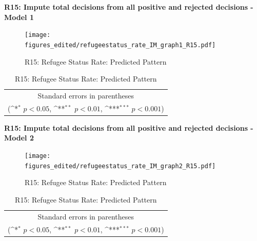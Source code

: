 \documentclass[10pt,a4paper]{scrartcl}
\begin{document}
\clearpage
\textbf{R15: Impute total decisions from all positive and rejected decisions - Model 1}
\begin{figure}[!ht]
	\centering
	\texttt{[image: figures\_edited/refugeestatus\_rate\_IM\_graph1\_R15.pdf]}
	\caption{R15: Refugee Status Rate: Predicted Pattern}
\end{figure}

\begin{table}[!ht]\centering
	\renewcommand{\arraystretch}{1.25}
	\def\sym#1{\ifmmode^{#1}\else\(^{#1}\)\fi}
	\caption{R15: Refugee Status Rate: Predicted Pattern}
	\begin{tabular}{l*{2}{c}}
		\hline\hline
		
		\hline\hline
		\multicolumn{3}{c}{\footnotesize Standard errors in parentheses} \\
		\multicolumn{3}{c}{\footnotesize (\sym{*} \(p<0.05\), \sym{**} \(p<0.01\), \sym{***} \(p<0.001\))}\\
	\end{tabular}
\end{table}

\clearpage
\textbf{R15: Impute total decisions from all positive and rejected decisions - Model 2}
\begin{figure}[!ht]
	\centering
	\texttt{[image: figures\_edited/refugeestatus\_rate\_IM\_graph2\_R15.pdf]}
	\caption{R15: Refugee Status Rate: Predicted Pattern}
\end{figure}

\begin{table}[!ht]\centering
	\footnotesize
	\renewcommand{\arraystretch}{1.2}
	\def\sym#1{\ifmmode^{#1}\else\(^{#1}\)\fi}
	\caption{R15: Refugee Status Rate: Predicted Pattern}
	\begin{tabular}{l*{2}{c}}
		\hline\hline
		
		\hline\hline
		\multicolumn{3}{c}{\footnotesize Standard errors in parentheses} \\
		\multicolumn{3}{c}{\footnotesize (\sym{*} \(p<0.05\), \sym{**} \(p<0.01\), \sym{***} \(p<0.001\))} \\
	\end{tabular}
\end{table}






\clearpage
\FloatBarrier
\end{document}
